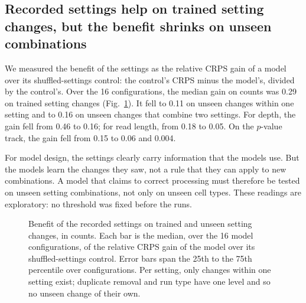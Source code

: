\documentclass[pdflatex,sn-mathphys-num]{sn-jnl}
\newcommand{\lit}[1]{#1}
\newcommand{\genCropSame}{0.05}
\newcommand{\genCropTr}{0.18}
\newcommand{\genDepthSame}{0.16}
\newcommand{\genDepthTr}{0.46}
\newcommand{\nGenCfg}{16}
\newcommand{\relCntCross}{0.16}
\newcommand{\relCntSame}{0.11}
\newcommand{\relCntTr}{0.29}
\newcommand{\relPCross}{0.004}
\newcommand{\relPSame}{0.06}
\newcommand{\relPTr}{0.15}
\begin{document}
\subsection{Recorded settings help on trained setting changes, but the benefit shrinks on unseen combinations}\label{sec:r4}

We measured the benefit of the settings as the relative CRPS gain of a model over its
shuffled-settings control: the control's CRPS minus the model's, divided by the control's.
Over the \nGenCfg{} configurations, the median gain on counts was \relCntTr{} on trained
setting changes (Fig.~\ref{fig:gen}). It fell to \relCntSame{} on unseen changes within one
setting and to \relCntCross{} on unseen changes that combine two settings. For depth, the gain
fell from \genDepthTr{} to \genDepthSame{}; for read length, from \genCropTr{} to
\genCropSame{}. On the $p$-value track, the gain fell from \relPTr{} to \relPSame{} and
\relPCross{}.

For model design, the settings clearly carry information that the models use. But the models
learn the changes they saw, not a rule that they can apply to new combinations. A model that
claims to correct processing must therefore be tested on unseen setting combinations, not only
on unseen cell types. These readings are exploratory: no threshold was fixed before the runs.

\begin{figure}[t]
\centering
{}
\caption{Benefit of the recorded settings on trained and unseen setting changes, in counts.
Each bar is the median, over the \nGenCfg{} model configurations, of the relative CRPS gain of
the model over its shuffled-settings control. Error bars span the \lit{25}th to the \lit{75}th percentile
over configurations. Per setting, only changes within one setting exist; duplicate removal and
run type have one level and so no unseen change of their own.}\label{fig:gen}
\end{figure}
\end{document}
